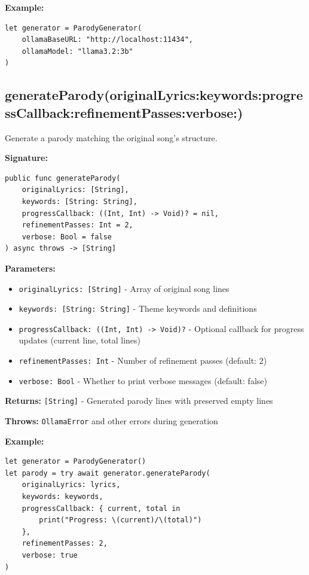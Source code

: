\documentclass[11pt,a4paper]{article}
\begin{document}
\textbf{Example:}
\begin{lstlisting}
let generator = ParodyGenerator(
    ollamaBaseURL: "http://localhost:11434",
    ollamaModel: "llama3.2:3b"
)
\end{lstlisting}

\subsection{generateParody(originalLyrics:keywords:progressCallback:refinementPasses:verbose:)}

Generate a parody matching the original song's structure.

\textbf{Signature:}
\begin{lstlisting}
public func generateParody(
    originalLyrics: [String],
    keywords: [String: String],
    progressCallback: ((Int, Int) -> Void)? = nil,
    refinementPasses: Int = 2,
    verbose: Bool = false
) async throws -> [String]
\end{lstlisting}

\textbf{Parameters:}
\begin{itemize}
    \item \texttt{originalLyrics: [String]} - Array of original song lines
    \item \texttt{keywords: [String: String]} - Theme keywords and definitions
    \item \texttt{progressCallback: ((Int, Int) -> Void)?} - Optional callback for progress updates (current line, total lines)
    \item \texttt{refinementPasses: Int} - Number of refinement passes (default: 2)
    \item \texttt{verbose: Bool} - Whether to print verbose messages (default: false)
\end{itemize}

\textbf{Returns:} \texttt{[String]} - Generated parody lines with preserved empty lines

\textbf{Throws:} \texttt{OllamaError} and other errors during generation

\textbf{Example:}
\begin{lstlisting}
let generator = ParodyGenerator()
let parody = try await generator.generateParody(
    originalLyrics: lyrics,
    keywords: keywords,
    progressCallback: { current, total in
        print("Progress: \(current)/\(total)")
    },
    refinementPasses: 2,
    verbose: true
)
\end{lstlisting}
\end{document}
